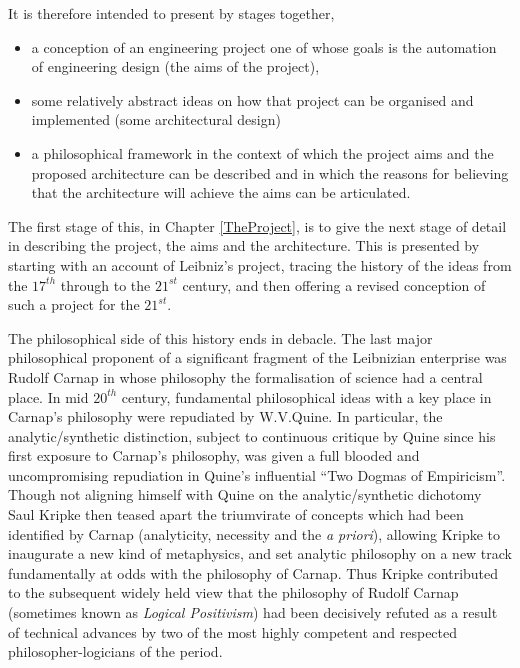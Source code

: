 It is therefore intended to present by stages together,
\begin{itemize}
\item a conception of an engineering project one of whose goals is the
  automation of engineering design (the aims of the project),
\item some relatively abstract ideas on how that project can be
  organised and implemented (some architectural design)
\item a philosophical framework in the context of which the project
  aims and the proposed architecture can be described and in which the
  reasons for believing that the architecture will achieve the aims
  can be articulated.
\end{itemize}

The first stage of this, in Chapter \ref{TheProject}, is to give the
next stage of detail in describing the project, the aims and the
architecture.
This is presented by starting with an account of Leibniz's project,
tracing the history of the ideas from the $17^{th}$ through to the
$21^{st}$ century, and then offering a revised conception of such a
project for the $21^{st}$.

The philosophical side of this history ends in debacle.
The last major philosophical proponent of a significant fragment of
the Leibnizian enterprise was Rudolf Carnap in whose philosophy the
formalisation of science had a central place.
In mid $20^{th}$ century, fundamental philosophical ideas with a key
place in Carnap's philosophy were repudiated by W.V.Quine.
In particular, the analytic/synthetic distinction, subject to
continuous critique by Quine since his first exposure to Carnap's
philosophy, was given a full blooded and uncompromising repudiation in
Quine's influential ``Two Dogmas of Empiricism''.
Though not aligning himself with Quine on the analytic/synthetic
dichotomy Saul Kripke then teased apart the triumvirate of concepts
which had been identified by Carnap (analyticity, necessity and the
\emph{a priori}), allowing Kripke to inaugurate a new kind of
metaphysics, and set analytic philosophy on a new track fundamentally
at odds with the philosophy of Carnap.
Thus Kripke contributed to the subsequent widely held view that the
philosophy of Rudolf Carnap (sometimes known as \emph{Logical
  Positivism}) had been decisively refuted as a result of technical
advances by two of the most highly competent and respected
philosopher-logicians of the period.

